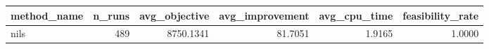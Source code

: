 \begin{tabular}{lrrrrr}
\toprule
method_name & n_runs & avg_objective & avg_improvement & avg_cpu_time & feasibility_rate \\
\midrule
nils & 489 & 8750.1341 & 81.7051 & 1.9165 & 1.0000 \\
\bottomrule
\end{tabular}
